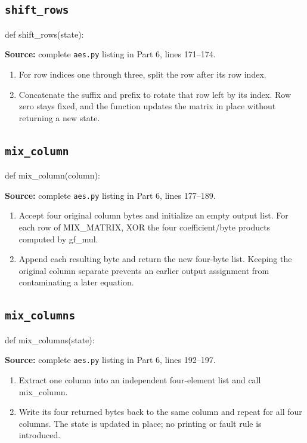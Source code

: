 \subsection{\texttt{shift\_\allowbreak{}rows}}
\begin{lightcode}
def shift_rows(state):
\end{lightcode}
\noindent\textbf{Source:} complete \texttt{aes.py} listing in Part 6, lines 171--174.
\begin{enumerate}
\item For row indices one through three, split the row after its row index.
\item Concatenate the suffix and prefix to rotate that row left by its index. Row zero stays fixed, and the function updates the matrix in place without returning a new state.
\end{enumerate}
\subsection{\texttt{mix\_\allowbreak{}column}}
\begin{lightcode}
def mix_column(column):
\end{lightcode}
\noindent\textbf{Source:} complete \texttt{aes.py} listing in Part 6, lines 177--189.
\begin{enumerate}
\item Accept four original column bytes and initialize an empty output list. For each row of MIX\_MATRIX, XOR the four coefficient/byte products computed by gf\_mul.
\item Append each resulting byte and return the new four-byte list. Keeping the original column separate prevents an earlier output assignment from contaminating a later equation.
\end{enumerate}
\subsection{\texttt{mix\_\allowbreak{}columns}}
\begin{lightcode}
def mix_columns(state):
\end{lightcode}
\noindent\textbf{Source:} complete \texttt{aes.py} listing in Part 6, lines 192--197.
\begin{enumerate}
\item Extract one column into an independent four-element list and call mix\_column.
\item Write its four returned bytes back to the same column and repeat for all four columns. The state is updated in place; no printing or fault rule is introduced.
\end{enumerate}
